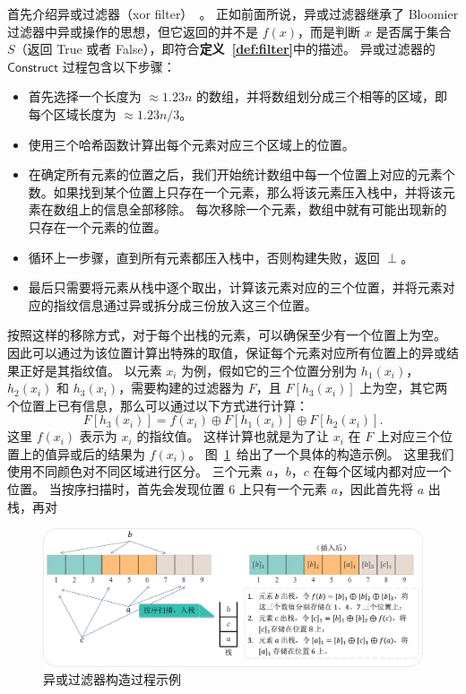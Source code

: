首先介绍异或过滤器（xor filter）~\cite{graf2020xor}。
正如前面所说，异或过滤器继承了 Bloomier 过滤器中异或操作的思想，但它返回的并不是 $f(x)$，而是判断 $x$ 是否属于集合 $S$（返回 True 或者 False），即符合\textbf{定义~\ref{def:filter}}中的描述。
异或过滤器的 $\mathsf{Construct}$ 过程包含以下步骤：
\begin{itemize}
  \item 首先选择一个长度为 $\approx 1.23n$ 的数组，并将数组划分成三个相等的区域，即每个区域长度为 $\approx 1.23n/3$。
  \item 使用三个哈希函数计算出每个元素对应三个区域上的位置。
  \item 在确定所有元素的位置之后，我们开始统计数组中每一个位置上对应的元素个数。如果找到某个位置上只存在一个元素，那么将该元素压入栈中，并将该元素在数组上的信息全部移除。
每次移除一个元素，数组中就有可能出现新的只存在一个元素的位置。
  \item 循环上一步骤，直到所有元素都压入栈中，否则构建失败，返回 $\perp$。
  \item 最后只需要将元素从栈中逐个取出，计算该元素对应的三个位置，并将元素对应的指纹信息通过异或拆分成三份放入这三个位置。
\end{itemize}
按照这样的移除方式，对于每个出栈的元素，可以确保至少有一个位置上为空。
因此可以通过为该位置计算出特殊的取值，保证每个元素对应所有位置上的异或结果正好是其指纹值。
以元素 $x_i$ 为例，假如它的三个位置分别为 $h_1(x_i)$，$h_2(x_i)$ 和 $h_3(x_i)$，需要构建的过滤器为 $F$，且 $F[h_3(x_i)]$ 上为空，其它两个位置上已有信息，那么可以通过以下方式进行计算：
\begin{equation}
  F[h_3(x_i)] = f(x_i) \oplus F[h_1(x_i)] \oplus F[h_2(x_i)].
\end{equation}
这里 $f(x_i)$ 表示为 $x_i$ 的指纹值。
这样计算也就是为了让 $x_i$ 在 $F$ 上对应三个位置上的值异或后的结果为 $f(x_i)$。
图~\ref{fig:xor_construc}~给出了一个具体的构造示例。
这里我们使用不同颜色对不同区域进行区分。
三个元素 $a$，$b$，$c$ 在每个区域内都对应一个位置。
当按序扫描时，首先会发现位置 $6$ 上只有一个元素 $a$，因此首先将 $a$ 出栈，再对

\begin{figure}[ht]
  \centering
  \includegraphics[width=\textwidth]{figures/xor_exp.pdf}
  \caption{异或过滤器构造过程示例}
  \label{fig:xor_construc}
\end{figure}


